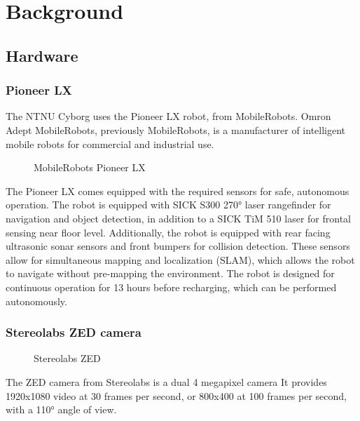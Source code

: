 \documentclass[\rootfolder/main.tex]{subfiles}
\begin{document}
\chapter{Background}
\label{ch:background}

\section{Hardware}

\subsection{Pioneer LX}

The NTNU Cyborg uses the Pioneer LX robot, from MobileRobots.
Omron Adept MobileRobots, previously MobileRobots, is a manufacturer of intelligent mobile robots for commercial and industrial use.

\begin{wrapfigure}{R}{0.5\columnwidth}
    \caption{MobileRobots Pioneer LX}
    \label{fig:pioneer-lx}
\end{wrapfigure}

The Pioneer LX comes equipped with the required sensors for safe, autonomous operation.
The robot is equipped with SICK S300 \ang{270} laser rangefinder for navigation and object detection, in addition to a SICK TiM 510 laser for frontal sensing near floor level.
Additionally, the robot is equipped with rear facing ultrasonic sonar sensors and front bumpers for collision detection.
These sensors allow for simultaneous mapping and localization (SLAM), which allows the robot to navigate without pre-mapping the environment.
The robot is designed for continuous operation for 13 hours before recharging, which can be performed autonomously.

\subsection{Stereolabs ZED camera}

\begin{figure}
    \caption{Stereolabs ZED}
    \label{fig:zed-camera}
\end{figure}

The ZED camera from Stereolabs is a dual 4 megapixel camera
It provides 1920x1080 video at 30 frames per second, or 800x400 at 100 frames per second, with a \ang{110} angle of view.
\end{document}
